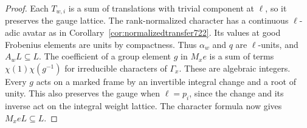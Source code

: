 \documentclass[a4paper,11pt]{article}
\theoremstyle{definition}
\theoremstyle{remark}
\numberwithin{equation}{section}
\begin{document}
\begin{proof}
Each \(T_{w,i}\) is a sum of translations with trivial
component at \(\ell\), so it preserves the gauge lattice.
The rank-normalized character has a continuous
\(\ell\)-adic avatar as in Corollary~\ref{cor:normalizedtransfer722}.
Its values at good Frobenius elements are units by
compactness. Thus \(\alpha_w\) and \(q\) are
\(\ell\)-units, and \(A_w L\subseteq L\).
The coefficient of a group element \(g\) in \(M_x e\)
is a sum of terms \(\chi(1)\chi(g^{-1})\) for
irreducible characters of \(\Gamma_x\). These are
algebraic integers. Every \(g\) acts on a marked frame
by an invertible integral change and a root of unity.
This also preserves the gauge when \(\ell=p_i\), since
the change and its inverse act on the integral weight
lattice. The character formula now gives \(M_x eL\subseteq L\).
\end{proof}
\end{document}

